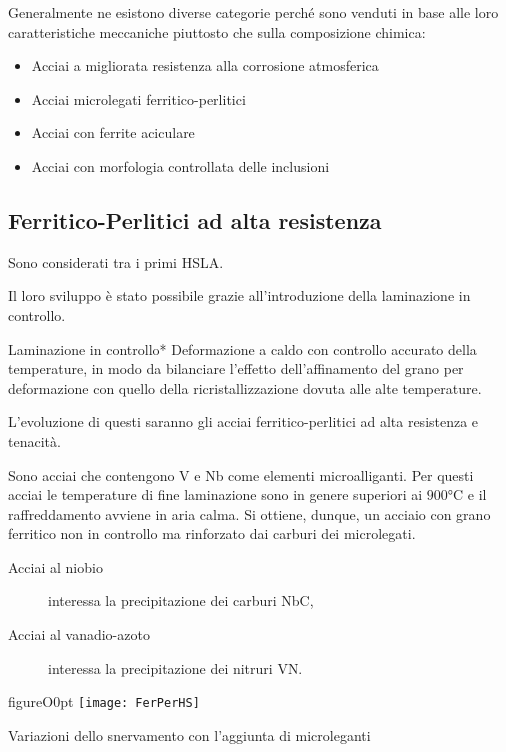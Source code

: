 Generalmente ne esistono diverse categorie perché sono venduti in base
alle loro caratteristiche meccaniche piuttosto che sulla composizione
chimica:
\begin{itemize}
\item Acciai a migliorata resistenza alla corrosione atmosferica
\item Acciai microlegati ferritico-perlitici
\item Acciai con ferrite aciculare
\item Acciai con morfologia controllata delle inclusioni
\end{itemize}

\newpage
\subsection{Ferritico-Perlitici ad alta resistenza}
Sono considerati tra i primi \ac{HSLA}.

Il loro sviluppo è stato possibile grazie all'introduzione della laminazione in controllo.

\begin{definition}{Laminazione in controllo}{*}
Deformazione a caldo con controllo accurato della temperature,
in modo da bilanciare l'effetto dell'affinamento del grano per
deformazione con quello della ricristallizzazione dovuta alle 
alte temperature.
\end{definition}

L'evoluzione di questi saranno gli acciai ferritico-perlitici
ad alta resistenza e tenacità.

Sono acciai che contengono V e Nb come elementi microalliganti.
Per questi acciai le temperature di fine laminazione sono in genere 
superiori ai $900\unit{\celsius}$ e il raffreddamento avviene in
aria calma.
Si ottiene, dunque, un acciaio con grano ferritico non in controllo ma
rinforzato dai carburi dei microlegati.
\begin{description}
\item[Acciai al niobio] interessa la precipitazione dei carburi NbC,
\item[Acciai al vanadio-azoto] interessa la precipitazione dei nitruri
VN.
\end{description}

\begin{wrapfloat}{figure}{O}{0pt}
\texttt{[image: FerPerHS]}
\caption{Variazioni dello snervamento con l'aggiunta di microleganti}
\label{fig:FerPerHS}
\end{wrapfloat}

